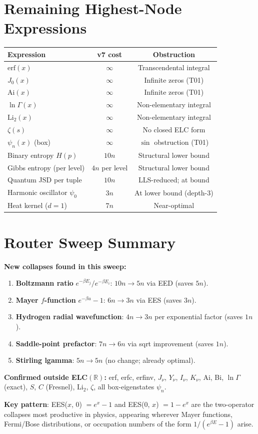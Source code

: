 \documentclass[11pt]{article}
\begin{document}
\section{Remaining Highest-Node Expressions}

\begin{center}
\begin{tabular}{lcc}
\toprule
Expression & v7 cost & Obstruction\\
\midrule
$\mathrm{erf}(x)$ & $\infty$ & Transcendental integral\\
$J_0(x)$ & $\infty$ & Infinite zeros (T01)\\
$\mathrm{Ai}(x)$ & $\infty$ & Infinite zeros (T01)\\
$\ln\Gamma(x)$ & $\infty$ & Non-elementary integral\\
$\mathrm{Li}_2(x)$ & $\infty$ & Non-elementary integral\\
$\zeta(s)$ & $\infty$ & No closed ELC form\\
$\psi_n(x)$ (box) & $\infty$ & $\sin$ obstruction (T01)\\
Binary entropy $H(p)$ & $10n$ & Structural lower bound\\
Gibbs entropy (per level) & $4n$ per level & Structural lower bound\\
Quantum JSD per tuple & $10n$ & LLS-reduced; at bound\\
Harmonic oscillator $\psi_0$ & $3n$ & At lower bound (depth-3)\\
Heat kernel ($d=1$) & $7n$ & Near-optimal\\
\bottomrule
\end{tabular}
\end{center}

\section{Router Sweep Summary}

\textbf{New collapses found in this sweep:}
\begin{enumerate}
  \item \textbf{Boltzmann ratio} $e^{-\beta E_j}/e^{-\beta E_i}$: $10n\to5n$ via EED (saves $5n$).
  \item \textbf{Mayer $f$-function} $e^{-\beta u}-1$: $6n\to3n$ via EES (saves $3n$).
  \item \textbf{Hydrogen radial wavefunction}: $4n\to3n$ per exponential factor (saves $1n$).
  \item \textbf{Saddle-point prefactor}: $7n\to6n$ via sqrt improvement (saves $1n$).
  \item \textbf{Stirling lgamma}: $5n\to5n$ (no change; already optimal).
\end{enumerate}

\textbf{Confirmed outside ELC$(\mathbb{R})$:} erf, erfc, erfinv, $J_\nu$, $Y_\nu$, $I_\nu$, $K_\nu$,
Ai, Bi, $\ln\Gamma$ (exact), $S$, $C$ (Fresnel), $\mathrm{Li}_2$, $\zeta$, all box-eigenstates $\psi_n$.

\textbf{Key pattern}: EES($x$, 0) $= e^x - 1$ and EES(0, $x$) $= 1 - e^x$ are the two-operator
collapses most productive in physics, appearing wherever Mayer functions, Fermi/Bose distributions,
or occupation numbers of the form $1/(e^{\beta E}-1)$ arise.
\end{document}
